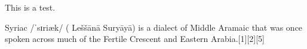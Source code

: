 \documentclass[9pt,a4paper]{article}
\begin{document}
This is a test. \lipsum 
\newfontfamily{}

Syriac /ˈsɪriæk/ ({} Leššānā Suryāyā) is a dialect of Middle Aramaic that was once spoken across much of the Fertile Crescent and Eastern Arabia.[1][2][5] 
\end{document}
